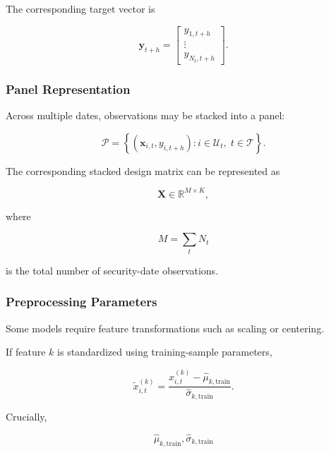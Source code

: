 \documentclass[11pt,a4paper]{article}
\begin{document}
The corresponding target vector is

\begin{equation}
\mathbf{y}_{t+h}
=
\begin{bmatrix}
y_{1,t+h}
\\
\vdots
\\
y_{N_t,t+h}
\end{bmatrix}.
\end{equation}


\subsubsection{Panel Representation}

Across multiple dates, observations may be stacked into a panel:

\begin{equation}
\mathcal{P}
=
\left\{
(\mathbf{x}_{i,t},y_{i,t+h})
:
i\in\mathcal{U}_t,
\;
t\in\mathcal{T}
\right\}.
\end{equation}

The corresponding stacked design matrix can be represented as

\begin{equation}
\mathbf{X}
\in
\mathbb{R}^{M\times K},
\end{equation}

where

\begin{equation}
M
=
\sum_t N_t
\end{equation}

is the total number of security-date observations.


\subsubsection{Preprocessing Parameters}

Some models require feature transformations such as scaling or centering.

If feature $k$ is standardized using training-sample parameters,

\begin{equation}
\widetilde{x}_{i,t}^{(k)}
=
\frac{
x_{i,t}^{(k)}
-
\widehat{\mu}_{k,\mathrm{train}}
}{
\widehat{\sigma}_{k,\mathrm{train}}
}.
\end{equation}

Crucially,

\begin{equation}
\boxed{
\widehat{\mu}_{k,\mathrm{train}},
\widehat{\sigma}_{k,\mathrm{train}}
}
\end{equation}
\end{document}
